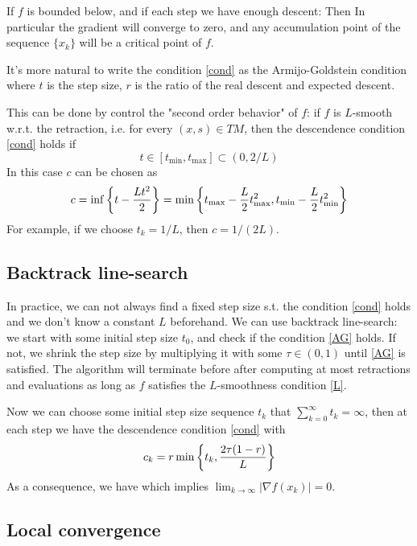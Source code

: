 \documentclass[a4paper]{mynotes}
\begin{document}
If $f$ is bounded below, and  if each step we have enough descent:
Then 
In particular the gradient will converge to zero, and any accumulation point of the sequence $\{x_k\}$ will be a critical point of $f$. 

It's more natural to write the condition \ref{cond} as the Armijo-Goldstein condition
 where $t$ is the step size, $r$ is the ratio of the real descent and expected descent.

This can be done by control the "second order behavior" of $f$: if $f$ is $L$-smooth w.r.t. the retraction, i.e.  for every $(x,s)\in TM$, then the descendence condition \ref{cond} holds if $$t\in [t_{\min},t_{\max}]\subset (0,2/L)$$In this case $c$ can be chosen as $$c=\inf \left\{t-\frac{Lt^2}{2}\right\}=\min \left\{t_{\max}-\frac{L}{2}t_{\max}^2,t_{\min}-\frac{L}{2}t_{\min}^2\right\}$$
For example, if we choose $t_k=1/L$, then $c=1/(2L)$.




\subsection{Backtrack line-search}
In practice, we can not always find a fixed step size s.t. the condition \ref{cond} holds and we don't know a constant $L$ beforehand. We can use backtrack line-search: we start with some initial step size $t_0$, and check if the condition \ref{AG} holds. If not, we shrink the step size by multiplying it with some $\tau\in (0,1)$ until \ref{AG} is satisfied. The algorithm will terminate before  after computing at most retractions and evaluations as long as $f$ satisfies the $L$-smoothness condition \ref{L}. 

Now we can choose some initial step size sequence $t_k$ that $\sum_{k=0}^\infty t_k=\infty$, then at each step we have the descendence condition \ref{cond} with $$c_k=r\min\left\{t_k,\frac{2\tau (1-r)}{L}\right\}$$
As a consequence, we have  which implies $\lim_{k\to\infty}|\nabla f(x_k)|=0$.



\subsection{Local convergence}
\end{document}
